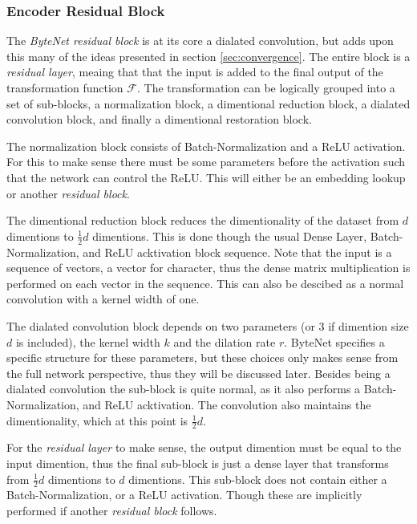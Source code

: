 \subsubsection{Encoder Residual Block}

The \textit{ByteNet residual block} is at its core a dialated convolution, but adds upon this many of the ideas presented in section \ref{sec:convergence}. The entire block is a \textit{residual layer}, meaing that that the input is added to the final output of the transformation function $\mathcal{F}$. The transformation can be logically grouped into a set of sub-blocks, a normalization block, a dimentional reduction block, a dialated convolution block, and finally a dimentional restoration block.

The normalization block consists of Batch-Normalization and a ReLU activation. For this to make sense there must be some parameters before the activation such that the network can control the ReLU. This will either be an embedding lookup or another \textit{residual block}.

The dimentional reduction block reduces the dimentionality of the dataset from $d$ dimentions to $\frac{1}{2}d$ dimentions. This is done though the usual Dense Layer, Batch-Normalization, and ReLU acktivation block sequence. Note that the input is a sequence of vectors, a vector for character, thus the dense matrix multiplication is performed on each vector in the sequence. This can also be descibed as a normal convolution with a kernel width of one.

\afterpage{\clearpage}

The dialated convolution block depends on two parameters (or 3 if dimention size $d$ is included), the kernel width $k$ and the dilation rate $r$. ByteNet specifies a specific structure for these parameters, but these choices only makes sense from the full network perspective, thus they will be discussed later. Besides being a dialated convolution the sub-block is quite normal, as it also performs a Batch-Normalization, and ReLU acktivation. The convolution also maintains the dimentionality, which at this point is $\frac{1}{2}d$.

For the \textit{residual layer} to make sense, the output dimention must be equal to the input dimention, thus the final sub-block is just a dense layer that transforms from $\frac{1}{2}d$ dimentions to $d$ dimentions. This sub-block does not contain either a Batch-Normalization, or a ReLU activation. Though these are implicitly performed if another \textit{residual block} follows.

